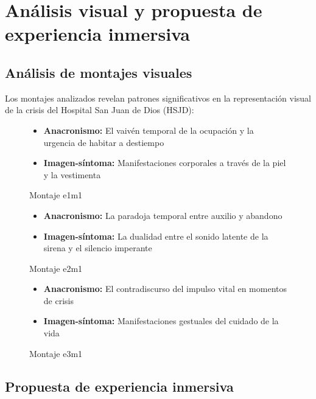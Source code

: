 
\section{Análisis visual y propuesta de experiencia inmersiva}

\subsection{Análisis de montajes visuales}

Los montajes analizados revelan patrones significativos en la representación visual de la crisis del Hospital San Juan de Dios (HSJD):

\begin{figure}[h]
\caption{Montaje e1m1}
\begin{itemize}
\item \textbf{Anacronismo:} El vaivén temporal de la ocupación y la urgencia de habitar a destiempo
\item \textbf{Imagen-síntoma:} Manifestaciones corporales a través de la piel y la vestimenta
\end{itemize}
\end{figure}

\begin{figure}[h]
\caption{Montaje e2m1}
\begin{itemize}
\item \textbf{Anacronismo:} La paradoja temporal entre auxilio y abandono
\item \textbf{Imagen-síntoma:} La dualidad entre el sonido latente de la sirena y el silencio imperante
\end{itemize}
\end{figure}

\begin{figure}[h]
\caption{Montaje e3m1}
\begin{itemize}
\item \textbf{Anacronismo:} El contradiscurso del impulso vital en momentos de crisis
\item \textbf{Imagen-síntoma:} Manifestaciones gestuales del cuidado de la vida
\end{itemize}
\end{figure}

\subsection{Propuesta de experiencia inmersiva}

